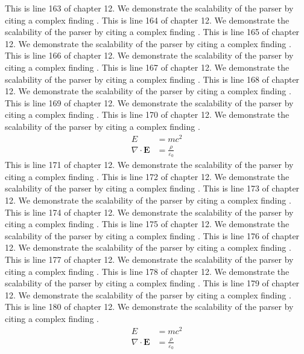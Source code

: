 This is line 163 of chapter 12. We demonstrate the scalability of the parser by citing a complex finding \cite{ref12_163}.
This is line 164 of chapter 12. We demonstrate the scalability of the parser by citing a complex finding \cite{ref12_164}.
This is line 165 of chapter 12. We demonstrate the scalability of the parser by citing a complex finding \cite{ref12_165}.
This is line 166 of chapter 12. We demonstrate the scalability of the parser by citing a complex finding \cite{ref12_166}.
This is line 167 of chapter 12. We demonstrate the scalability of the parser by citing a complex finding \cite{ref12_167}.
This is line 168 of chapter 12. We demonstrate the scalability of the parser by citing a complex finding \cite{ref12_168}.
This is line 169 of chapter 12. We demonstrate the scalability of the parser by citing a complex finding \cite{ref12_169}.
This is line 170 of chapter 12. We demonstrate the scalability of the parser by citing a complex finding \cite{ref12_170}.
\begin{align*}
  E &= mc^2 \\
  \nabla \cdot \mathbf{E} &= \frac{\rho}{\varepsilon_0}
\end{align*}
This is line 171 of chapter 12. We demonstrate the scalability of the parser by citing a complex finding \cite{ref12_171}.
This is line 172 of chapter 12. We demonstrate the scalability of the parser by citing a complex finding \cite{ref12_172}.
This is line 173 of chapter 12. We demonstrate the scalability of the parser by citing a complex finding \cite{ref12_173}.
This is line 174 of chapter 12. We demonstrate the scalability of the parser by citing a complex finding \cite{ref12_174}.
This is line 175 of chapter 12. We demonstrate the scalability of the parser by citing a complex finding \cite{ref12_175}.
This is line 176 of chapter 12. We demonstrate the scalability of the parser by citing a complex finding \cite{ref12_176}.
This is line 177 of chapter 12. We demonstrate the scalability of the parser by citing a complex finding \cite{ref12_177}.
This is line 178 of chapter 12. We demonstrate the scalability of the parser by citing a complex finding \cite{ref12_178}.
This is line 179 of chapter 12. We demonstrate the scalability of the parser by citing a complex finding \cite{ref12_179}.
This is line 180 of chapter 12. We demonstrate the scalability of the parser by citing a complex finding \cite{ref12_180}.
\begin{align*}
  E &= mc^2 \\
  \nabla \cdot \mathbf{E} &= \frac{\rho}{\varepsilon_0}
\end{align*}
